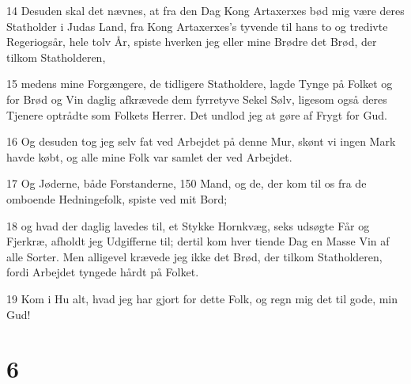 \par 14 Desuden skal det nævnes, at fra den Dag Kong Artaxerxes bød mig være deres Statholder i Judas Land, fra Kong Artaxerxes's tyvende til hans to og tredivte Regeriogsår, hele tolv År, spiste hverken jeg eller mine Brødre det Brød, der tilkom Statholderen,
\par 15 medens mine Forgængere, de tidligere Statholdere, lagde Tynge på Folket og for Brød og Vin daglig afkrævede dem fyrretyve Sekel Sølv, ligesom også deres Tjenere optrådte som Folkets Herrer. Det undlod jeg at gøre af Frygt for Gud.
\par 16 Og desuden tog jeg selv fat ved Arbejdet på denne Mur, skønt vi ingen Mark havde købt, og alle mine Folk var samlet der ved Arbejdet.
\par 17 Og Jøderne, både Forstanderne, 150 Mand, og de, der kom til os fra de omboende Hedningefolk, spiste ved mit Bord;
\par 18 og hvad der daglig lavedes til, et Stykke Hornkvæg, seks udsøgte Får og Fjerkræ, afholdt jeg Udgifferne til; dertil kom hver tiende Dag en Masse Vin af alle Sorter. Men alligevel krævede jeg ikke det Brød, der tilkom Statholderen, fordi Arbejdet tyngede hårdt på Folket.
\par 19 Kom i Hu alt, hvad jeg har gjort for dette Folk, og regn mig det til gode, min Gud!

\chapter{6}

